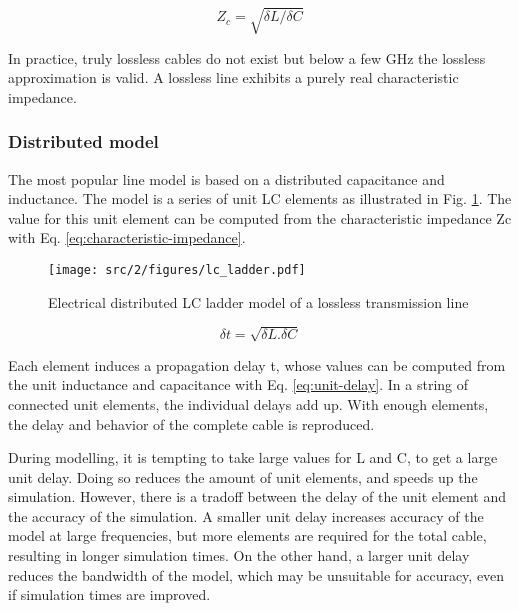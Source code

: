 \begin{equation}
Z_{c} = \sqrt{\delta L/ \delta C}
\label{eq:characteristic-impedance}
\end{equation}

In practice, truly lossless cables do not exist but below a few GHz the lossless approximation is valid.
A lossless line exhibits a purely real characteristic impedance.

\subsubsection{Distributed model}
The most popular line model is based on a distributed capacitance and inductance.
The model is a series of unit LC elements as illustrated in Fig. \ref{fig:dis-line-model}.
The value for this unit element can be computed from the characteristic impedance \gls{Zc} with Eq. \ref{eq:characteristic-impedance}.

\begin{figure}[!h]
  \centering
  \texttt{[image: src/2/figures/lc\_ladder.pdf]}
  \caption{Electrical distributed LC ladder model of a lossless transmission line}
  \label{fig:dis-line-model}
\end{figure}

\begin{equation}
\delta t = \sqrt{\delta L.\delta C}
\label{eq:unit-delay}
\end{equation}

Each element induces a propagation delay \textdelta{}t, whose values can be computed from the unit inductance and capacitance with Eq. \ref{eq:unit-delay}.
In a string of connected unit elements, the individual delays add up.
With enough elements, the delay and behavior of the complete cable is reproduced.

During modelling, it is tempting to take large values for \textdelta{}L and \textdelta{}C, to get a large unit delay.
Doing so reduces the amount of unit elements, and speeds up the simulation.
However, there is a tradoff between the delay of the unit element and the accuracy of the simulation.
A smaller unit delay increases accuracy of the model at large frequencies, but more elements are required for the total cable, resulting in longer simulation times.
On the other hand, a larger unit delay reduces the bandwidth of the model, which may be unsuitable for accuracy, even if simulation times are improved.

